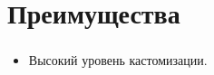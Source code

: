 \section{Преимущества}

\begin{frame}
\frametitle{\insertsection} 
\framesubtitle{\insertsubsection}
    \begin{itemize}
        \item Высокий уровень кастомизации.
    \end{itemize}
\end{frame}